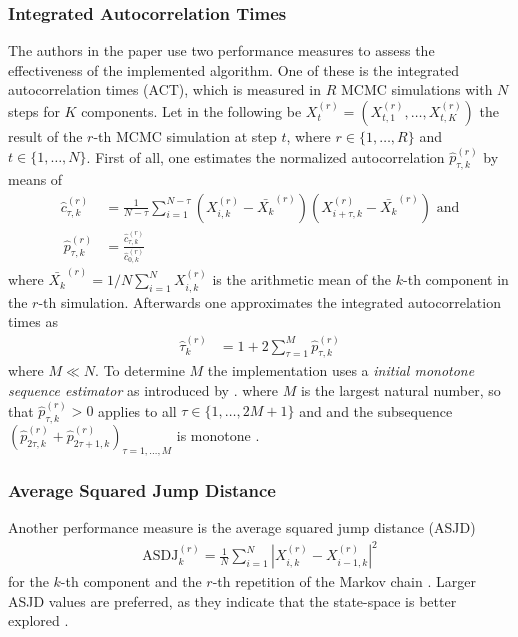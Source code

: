 \documentclass{scrartcl}
\begin{document}
    \subsubsection{Integrated Autocorrelation Times}
    The authors in the paper \cite{lau2019} use two performance measures to assess the effectiveness of the implemented
    algorithm. One of these is the integrated autocorrelation times (ACT), which is measured in $R$ MCMC
    simulations with $N$ steps for $K$ components. Let in the following be
    $X_t^{(r)}=(X_{t,1}^{(r)},\dots,X_{t,K}^{(r)})$ the result of the $r$-th MCMC simulation at step $t$, where
    $r\in\{1,\dots,R\}$ and $t\in\{1,\dots,N\}$. First of all, one estimates the normalized autocorrelation $\hat{p}_{\tau,k}^{(r)}$
    by means of
    \begin{align*}
        \hat{c}_{\tau,k}^{(r)}&=\frac{1}{N-\tau}\sum\limits_{i=1}^{N-\tau}(X_{i,k}^{(r)}-\bar{X_k}^{(r)})(X_{i+\tau,k}^{(r)}-\bar{X_k}^{(r)})\text{ and}\\\
        \hat{p}_{\tau,k}^{(r)}&=\frac{\hat{c}_{\tau,k}^{(r)}}{\hat{c}_{0,k}^{(r)}}
    \end{align*}
    where $\bar{X_k}^{(r)}=1/N\sum\nolimits_{i=1}^NX_{i,k}^{(r)}$ is the arithmetic mean of the $k$-th component in the $r$-th
    simulation. Afterwards one approximates the integrated autocorrelation times as
    \begin{align*}
        \hat{\tau}_{k}^{(r)}&=1+2\sum\limits_{\tau=1}^M\hat{p}_{\tau,k}^{(r)}
    \end{align*}
    \cite{autocorrelation_blog} where $M\ll N$. To determine $M$ the implementation uses a \textit{initial monotone sequence estimator}
    as introduced by \cite{geyer1992}. where $M$ is the largest natural number, so that $\hat{p}_{\tau,k}^{(r)} > 0$ applies to all $\tau\in\{1,\dots,2M+1\}$ and
    and the subsequence $(\hat{p}_{2\tau,k}^{(r)} + \hat{p}_{2\tau+1,k}^{(r)})_{\tau=1,\dots,M}$ is monotone \cite{geyer1992}.

    \subsubsection{Average Squared Jump Distance}
    Another performance measure is the average squared jump distance (ASJD)
    \begin{align*}
        \text{ASDJ}_k^{(r)}=\frac{1}{N}\sum\limits_{i=1}^N|X_{i,k}^{(r)}-X_{i-1,k}^{(r)}|^2
    \end{align*}
    for the $k$-th component and the $r$-th repetition of the Markov chain \cite{lau2019}.
    Larger ASJD values are preferred, as they indicate that the state-space is better explored \cite{lau2019}.
\end{document}
